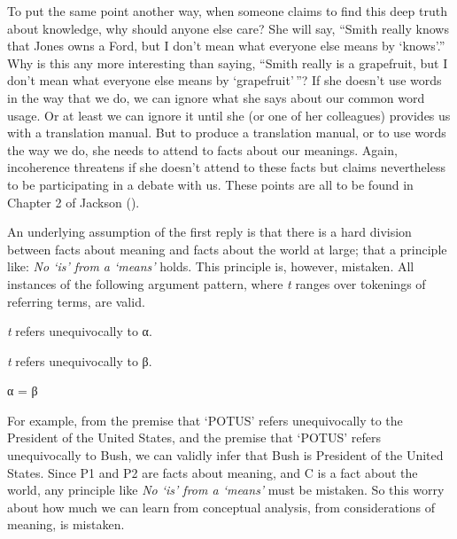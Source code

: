 \documentclass[
  11pt,
  letterpaper,
  DIV=11,
  numbers=noendperiod,
  twoside]{scrartcl}
\providecommand{\tightlist}{%
  \setlength{\itemsep}{0pt}\setlength{\parskip}{0pt}}\usepackage{longtable,booktabs,array}
\begin{document}
To put the same point another way, when someone claims to find this deep
truth about knowledge, why should anyone else care? She will say,
``Smith really knows that Jones owns a Ford, but I don't mean what
everyone else means by `knows'.'' Why is this any more interesting than
saying, ``Smith really is a grapefruit, but I don't mean what everyone
else means by `grapefruit'\,''? If she doesn't use words in the way that
we do, we can ignore what she says about our common word usage. Or at
least we can ignore it until she (or one of her colleagues) provides us
with a translation manual. But to produce a translation manual, or to
use words the way we do, she needs to attend to facts about our
meanings. Again, incoherence threatens if she doesn't attend to these
facts but claims nevertheless to be participating in a debate with us.
These points are all to be found in Chapter 2 of Jackson
().

An underlying assumption of the first reply is that there is a hard
division between facts about meaning and facts about the world at large;
that a principle like: \emph{No `is' from a `means'} holds. This
principle is, however, mistaken. All instances of the following argument
pattern, where \emph{t} ranges over tokenings of referring terms, are
valid.

\begin{description}
\tightlist
\item[P1.]
\emph{t} refers unequivocally to α.
\item[P2.]
\emph{t} refers unequivocally to β.
\item[C.]
α = β
\end{description}

For example, from the premise that `POTUS' refers unequivocally to the
President of the United States, and the premise that `POTUS' refers
unequivocally to Bush, we can validly infer that Bush is President of
the United States. Since P1 and P2 are facts about meaning, and C is a
fact about the world, any principle like \emph{No `is' from a `means'}
must be mistaken. So this worry about how much we can learn from
conceptual analysis, from considerations of meaning, is mistaken.
\end{document}
